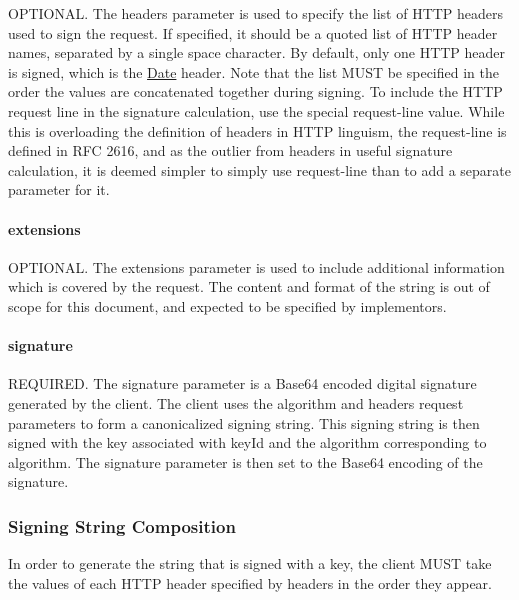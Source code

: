 O\+P\+T\+I\+O\+N\+AL. The {\ttfamily headers} parameter is used to specify the list of H\+T\+TP headers used to sign the request. If specified, it should be a quoted list of H\+T\+TP header names, separated by a single space character. By default, only one H\+T\+TP header is signed, which is the {\ttfamily \mbox{\hyperlink{classDate}{Date}}} header. Note that the list M\+U\+ST be specified in the order the values are concatenated together during signing. To include the H\+T\+TP request line in the signature calculation, use the special {\ttfamily request-\/line} value. While this is overloading the definition of {\ttfamily headers} in H\+T\+TP linguism, the request-\/line is defined in R\+FC 2616, and as the outlier from headers in useful signature calculation, it is deemed simpler to simply use {\ttfamily request-\/line} than to add a separate parameter for it.

\paragraph*{extensions}

O\+P\+T\+I\+O\+N\+AL. The {\ttfamily extensions} parameter is used to include additional information which is covered by the request. The content and format of the string is out of scope for this document, and expected to be specified by implementors.

\paragraph*{signature}

R\+E\+Q\+U\+I\+R\+ED. The {\ttfamily signature} parameter is a {\ttfamily Base64} encoded digital signature generated by the client. The client uses the {\ttfamily algorithm} and {\ttfamily headers} request parameters to form a canonicalized {\ttfamily signing string}. This {\ttfamily signing string} is then signed with the key associated with {\ttfamily key\+Id} and the algorithm corresponding to {\ttfamily algorithm}. The {\ttfamily signature} parameter is then set to the {\ttfamily Base64} encoding of the signature.

\subsubsection*{Signing String Composition}

In order to generate the string that is signed with a key, the client M\+U\+ST take the values of each H\+T\+TP header specified by {\ttfamily headers} in the order they appear.


